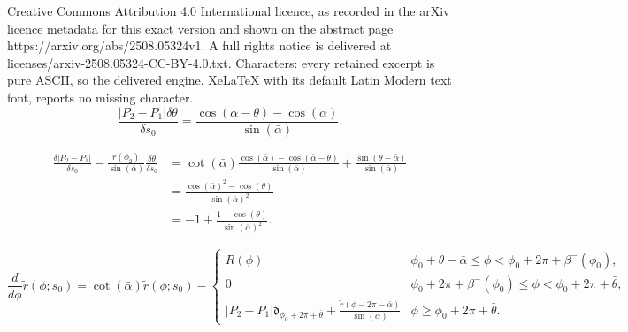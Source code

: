 \documentclass[10pt,a4paper]{amsart}
\newcommand{\Diracd}{\mathfrak{d}}
\begin{document}
Creative Commons Attribution 4.0 International licence, as recorded in the arXiv licence metadata for this exact version and shown on the abstract page https://arxiv.org/abs/2508.05324v1. A full rights notice is delivered at licenses/arxiv-2508.05324-CC-BY-4.0.txt. Characters: every retained excerpt is pure ASCII, so the delivered engine, XeLaTeX with its default Latin Modern text font, reports no missing character.
\begin{equation}
\label{Equa:delta_theta_segm_1}
\frac{|P_2 - P_1| \delta \theta}{\delta s_0} = \frac{\cos(\bar \alpha - \theta) - \cos(\bar \alpha)}{\sin(\bar \alpha)}.
\end{equation}

\begin{equation}
\label{Equa:delta_P_2P_1_segm}
\begin{split}
\frac{\delta |P_2 - P_1|}{\delta s_0} - \frac{r(\phi_2)}{\sin(\bar \alpha)} \frac{\delta \theta}{\delta s_0} &= \cot(\bar \alpha) \frac{\cos(\bar \alpha) - \cos(\bar \alpha - \theta)}{\sin(\bar \alpha)} + \frac{\sin(\theta - \bar \alpha)}{\sin(\bar \alpha)} \\
&= \frac{\cos(\bar \alpha)^2 - \cos(\theta)}{\sin(\bar \alpha)^2} \\
&= - 1 + \frac{1 - \cos(\theta)}{\sin(\bar \alpha)^2}.
\end{split}
\end{equation}

\begin{equation}
\label{Equa:segm_equ_tilde_r}
\frac{d}{d\phi} \tilde r(\phi;s_0) = \cot(\bar \alpha) \tilde r(\phi;s_0) - \begin{cases}
R(\phi) & \phi_0 + \bar \theta - \bar \alpha \leq \phi < \phi_0 + 2\pi + \beta^-(\phi_0), \\
0 & \phi_0 + 2\pi + \beta^-(\phi_0) \leq \phi < \phi_0 + 2\pi + \bar \theta, \\
|P_2 - P_1| \Diracd_{\phi_0 + 2\pi + \bar \theta} + \frac{\tilde r(\phi - 2\pi - \bar \alpha)}{\sin(\bar \alpha)} & \phi \geq \phi_0 + 2\pi + \bar\theta.
\end{cases}
\end{equation}
\end{document}
